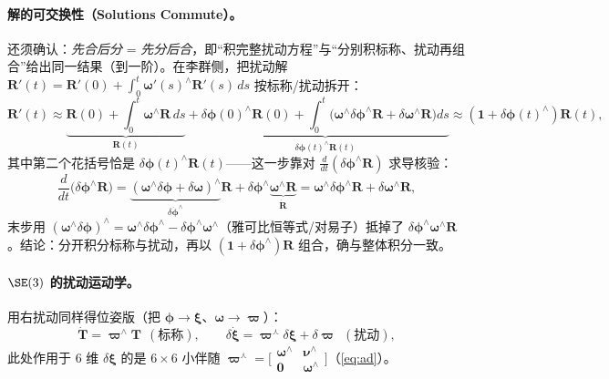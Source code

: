 \paragraph{解的可交换性（Solutions Commute）。}还须确认：\emph{先合后分} = \emph{先分后合}，即“积完整扰动方程”与“分别积标称、扰动再组合”给出同一结果（到一阶）。在李群侧，把扰动解 $\mathbf{R}'(t)=\mathbf{R}'(0)+\int_0^t\boldsymbol{\omega}'(s)^\wedge\mathbf{R}'(s)\,ds$ 按标称/扰动拆开：
\begin{equation}
  \mathbf{R}'(t)\approx\underbrace{\mathbf{R}(0)+\!\int_0^t\!\boldsymbol{\omega}^\wedge\mathbf{R}\,ds}_{\mathbf{R}(t)}
  +\underbrace{\delta\boldsymbol{\phi}(0)^\wedge\mathbf{R}(0)+\!\int_0^t\!\big(\boldsymbol{\omega}^\wedge\delta\boldsymbol{\phi}^\wedge\mathbf{R}+\delta\boldsymbol{\omega}^\wedge\mathbf{R}\big)ds}_{\delta\boldsymbol{\phi}(t)^\wedge\mathbf{R}(t)}
  \approx(\mathbf{1}+\delta\boldsymbol{\phi}(t)^\wedge)\mathbf{R}(t),
  \label{eq:lk-commute}
\end{equation}
其中第二个花括号恰是 $\delta\boldsymbol{\phi}(t)^\wedge\mathbf{R}(t)$——这一步靠对 $\tfrac{d}{dt}(\delta\boldsymbol{\phi}^\wedge\mathbf{R})$ 求导核验：
\begin{equation}
  \frac{d}{dt}\big(\delta\boldsymbol{\phi}^\wedge\mathbf{R}\big)
  =\underbrace{(\boldsymbol{\omega}^\wedge\delta\boldsymbol{\phi}+\delta\boldsymbol{\omega})^\wedge}_{\delta\dot{\boldsymbol{\phi}}^\wedge}\mathbf{R}+\delta\boldsymbol{\phi}^\wedge\underbrace{\boldsymbol{\omega}^\wedge\mathbf{R}}_{\dot{\mathbf{R}}}
  =\boldsymbol{\omega}^\wedge\delta\boldsymbol{\phi}^\wedge\mathbf{R}+\delta\boldsymbol{\omega}^\wedge\mathbf{R},
  \label{eq:lk-commute-deriv}
\end{equation}
末步用 $(\boldsymbol{\omega}^\wedge\delta\boldsymbol{\phi})^\wedge=\boldsymbol{\omega}^\wedge\delta\boldsymbol{\phi}^\wedge-\delta\boldsymbol{\phi}^\wedge\boldsymbol{\omega}^\wedge$（雅可比恒等式/对易子）抵掉了 $\delta\boldsymbol{\phi}^\wedge\boldsymbol{\omega}^\wedge\mathbf{R}$。结论：分开积分标称与扰动，再以 $(\mathbf{1}+\delta\boldsymbol{\phi}^\wedge)\mathbf{R}$ 组合，确与整体积分一致。

\paragraph{$\SE(3)$ 的扰动运动学。}用右扰动同样得位姿版（把 $\boldsymbol{\phi}\to\boldsymbol{\xi}$、$\boldsymbol{\omega}\to\boldsymbol{\varpi}$）：
\begin{equation}
  \dot{\mathbf{T}}=\boldsymbol{\varpi}^\wedge\mathbf{T}\ \ (\text{标称}),\qquad
  \delta\dot{\boldsymbol{\xi}}=\boldsymbol{\varpi}^\curlywedge\delta\boldsymbol{\xi}+\delta\boldsymbol{\varpi}\ \ (\text{扰动}),
  \label{eq:lk-pert-se3}
\end{equation}
此处作用于 $6$ 维 $\delta\boldsymbol{\xi}$ 的是 $6\times6$ 小伴随 $\boldsymbol{\varpi}^\curlywedge=\big[\begin{smallmatrix}\boldsymbol{\omega}^\wedge&\boldsymbol{\nu}^\wedge\\\mathbf{0}&\boldsymbol{\omega}^\wedge\end{smallmatrix}\big]$（\cref{eq:ad}）。


